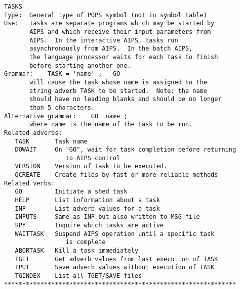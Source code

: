 \vskip 0.5pt
\bbve\begin{verbatim}
TASKS
Type:  General type of POPS symbol (not in symbol table)
Use:   Tasks are separate programs which may be started by
       AIPS and which receive their input parameters from
       AIPS.  In the interactive AIPS, tasks run
       asynchronously from AIPS.  In the batch AIPS,
       the language processor waits for each task to finish
       before starting another one.
Grammar:    TASK = 'name' ;   GO
       will cause the task whose name is assigned to the
       string adverb TASK to be started.  Note: the name
       should have no leading blanks and should be no longer
       than 5 characters.
Alternative grammar:    GO  name ;
       where name is the name of the task to be run.
Related adverbs:
   TASK       Task name
   DOWAIT     On "GO", wait for task completion before returning
                 to AIPS control
   VERSION    Version of task to be executed.
   QCREATE    Create files by fast or more reliable methods
Related verbs:
   GO         Initiate a shed task
   HELP       List information about a task
   INP        List adverb values for a task
   INPUTS     Same as INP but also written to MSG file
   SPY        Inquire which tasks are active
   WAITTASK   Suspend AIPS operation until a specific task
                 is complete
   ABORTASK   Kill a task immediately
   TGET       Get adverb values from last execution of TASK
   TPUT       Save adverb values without execution of TASK
   TGINDEX    List all TGET/SAVE files
****************************************************************


\end{verbatim}
